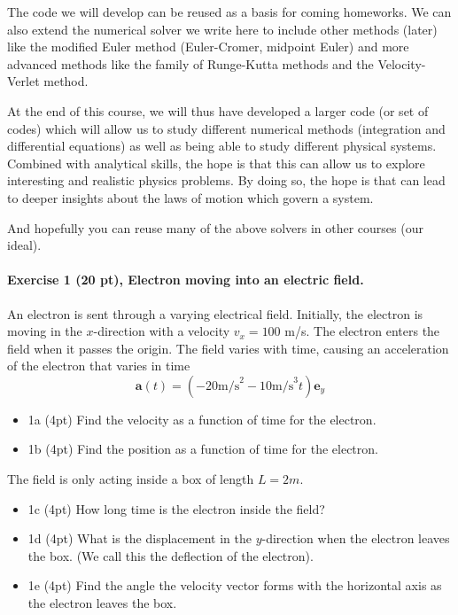 \documentclass[%
oneside,                 %
final,                   %
10pt]{article}
\begin{document}
The code we will develop can be reused as a basis for coming homeworks. We can
also extend the numerical solver we write here to include other methods (later) like
the modified Euler method (Euler-Cromer, midpoint Euler) and more
advanced methods like the family of Runge-Kutta methods and the Velocity-Verlet method.

At the end of this course, we will thus have developed a larger code
(or set of codes) which will allow us to study different numerical
methods (integration and differential equations) as well as being able
to study different physical systems. Combined with analytical skills,
the hope is that this can allow us to explore interesting and
realistic physics problems. By doing so, the hope is that can lead to
deeper insights about the laws of motion which govern a system.

And hopefully you can reuse many of the above solvers in other courses (our ideal).

\paragraph{Exercise 1 (20 pt), Electron moving into an electric field.}
An electron is sent through a varying electrical
field. Initially, the electron is moving in the $x$-direction with a velocity
$v_x = 100$ m/s. The electron enters the field when it passes the origin. The field
varies with time, causing an acceleration of the electron that varies in time
\[
\bm{a}(t)=\left(−20 \mathrm{m/s}^2 −10\mathrm{m/s}^3t\right) \bm{e}_y
\]
\begin{itemize}
\item 1a (4pt) Find the velocity as a function of time for the electron.

\item 1b (4pt)  Find the position as a function of time for the electron.
\end{itemize}

\noindent
The field is only acting inside a box of length $L = 2m$.
\begin{itemize}
\item 1c (4pt)  How long time is the electron inside the field?

\item 1d (4pt)  What is the displacement in the $y$-direction when the electron leaves the box. (We call this the deflection of the electron).

\item 1e (4pt)  Find the angle the velocity vector forms with the horizontal axis as the electron leaves the box.
\end{itemize}
\end{document}
